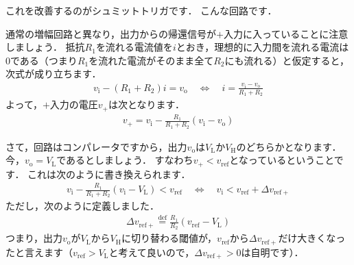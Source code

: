 ﻿\documentclass[a4paper]{jsarticle}
\begin{document}
\begin{figure}[h]
\begin{center}

\end{center}
\end{figure}

これを改善するのがシュミットトリガです．
こんな回路です．

\begin{figure}[h]
\begin{center}

\end{center}
\end{figure}

通常の増幅回路と異なり，出力からの帰還信号が$+$入力に入っていることに注意しましょう．
抵抗$R_{1}$を流れる電流値を$i$とおき，理想的に入力間を流れる電流は$0$である（つまり$R_{1}$を流れた電流がそのまま全て$R_{2}$にも流れる）と仮定すると，次式が成り立ちます．
\begin{align*}
v_{\mathrm{i}}-(R_{1}+R_{2})i=v_{\mathrm{o}}
\quad\Leftrightarrow\quad
i=\frac{v_{\mathrm{i}}-v_{\mathrm{o}}}{R_{1}+R_{2}}
\end{align*}
よって，$+$入力の電圧$v_{+}$は次となります．
\begin{align*}
v_{+}=v_{\mathrm{i}}-\frac{R_{1}}{R_{1}+R_{2}}(v_{\mathrm{i}}-v_{\mathrm{o}})
\end{align*}

さて，回路はコンパレータですから，出力$v_{\mathrm{o}}$は$V_{\mathrm{L}}$か$V_{\mathrm{H}}$のどちらかとなります．
今，$v_{\mathrm{o}}=V_{\mathrm{L}}$であるとしましょう．
すなわち$v_{+}<v_{\mathrm{ref}}$となっているということです．
これは次のように書き換えられます．
\begin{align*}
v_{\mathrm{i}}-\frac{R_{1}}{R_{1}+R_{2}}(v_{\mathrm{i}}-V_{\mathrm{L}})<v_{\mathrm{ref}}
\quad\Leftrightarrow\quad
v_{\mathrm{i}}<v_{\mathrm{ref}}+\varDelta v_{\mathrm{ref}+}
\end{align*}
ただし，次のように定義しました．
\begin{align*}
\varDelta v_{\mathrm{ref}+}\overset{\mathrm{def}}{=}\frac{R_{1}}{R_{2}}(v_{\mathrm{ref}}-V_{\mathrm{L}})
\end{align*}
つまり，出力$v_{\mathrm{o}}$が$V_{\mathrm{L}}$から$V_{\mathrm{H}}$に切り替わる閾値が，$v_{\mathrm{ref}}$から$\varDelta v_{\mathrm{ref}+}$だけ大きくなったと言えます（$v_{\mathrm{ref}}>V_{\mathrm{L}}$と考えて良いので，$\varDelta v_{\mathrm{ref}+}>0$は自明です）．
\end{document}
